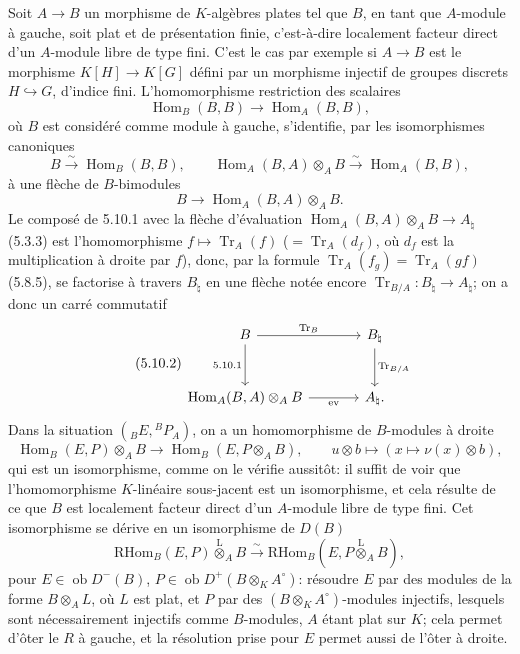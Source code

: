 \documentclass[11pt]{article}
\DeclareMathOperator{\Hom}{Hom}
\newcommand{\ob}{\operatorname{ob}}
\providecommand{\RHom}{\mathrm{RHom}}
\providecommand{\Tr}{\operatorname{Tr}}
\providecommand{\Tr}{\operatorname{Tr}}
\providecommand{\lten}{\overset{\mathrm L}{\otimes}}
\providecommand{\Tr}{\operatorname{Tr}}
\providecommand{\RHom}{\mathrm{RHom}}
\providecommand{\Hom}{\operatorname{Hom}}
\providecommand{\ob}{\operatorname{ob}}
\providecommand{\lten}{\overset{\mathrm L}{\otimes}}
\providecommand{\RHom}{\mathrm R\mathcal{H}om}
\providecommand{\lten}{\overset{\mathrm L}{\otimes}}
\providecommand{\Tr}{\operatorname{Tr}}
\providecommand{\lten}{\overset{\mathrm L}{\otimes}}
\providecommand{\lten}{\overset{\mathrm L}{\otimes}}
\providecommand{\lten}{\overset{\mathrm L}{\otimes}}
\begin{document}
Soit $A\to B$ un morphisme de $K$-algèbres plates tel que $B$, en tant que $A$-module à gauche, soit plat et de présentation finie, c'est-à-dire localement facteur direct d'un $A$-module libre de type fini. C'est le cas par exemple si $A\to B$ est le morphisme $K[H]\to K[G]$ défini par un morphisme injectif de groupes discrets $H\hookrightarrow G$, d'indice fini. L'homomorphisme restriction des scalaires
\[
\Hom_B(B,B)\longrightarrow\Hom_A(B,B),
\]
où $B$ est considéré comme module à gauche, s'identifie, par les isomorphismes canoniques
\[
B\xrightarrow{\sim}\Hom_B(B,B),\qquad \Hom_A(B,A)\otimes_AB\xrightarrow{\sim}\Hom_A(B,B),
\]
à une flèche de $B$-bimodules
\begin{equation}\tag{5.10.1}
B\longrightarrow\Hom_A(B,A)\otimes_AB.
\end{equation}
Le composé de 5.10.1 avec la flèche d'évaluation $\Hom_A(B,A)\otimes_AB\to A_\natural$ (5.3.3) est l'homomorphisme $f\mapsto\Tr_A(f)$ ($=\Tr_A(d_f)$, où $d_f$ est la multiplication à droite par $f$), donc, par la formule $\Tr_A(f_g)=\Tr_A(gf)$ (5.8.5), se factorise à travers $B_\natural$ en une flèche notée encore $\Tr_{B/A}:B_\natural\to A_\natural$; on a donc un carré commutatif
\begin{equation}\tag{5.10.2}
\begin{tikzcd}[column sep=large,row sep=large]
B \arrow[r,"\Tr_B"] \arrow[d,"5.10.1"'] & B_\natural \arrow[d,"\Tr_{B/A}"]\\
\Hom_A(B,A)\otimes_AB \arrow[r,"\mathrm{ev}"'] & A_\natural .
\end{tikzcd}
\end{equation}
Dans la situation $({}_BE,{}^BP_A)$, on a un homomorphisme de $B$-modules à droite
\begin{equation}\tag{5.10.3}
\Hom_B(E,P)\otimes_AB\longrightarrow\Hom_B(E,P\otimes_AB),\qquad
u\otimes b\longmapsto(x\longmapsto\nu(x)\otimes b),
\end{equation}
qui est un isomorphisme, comme on le vérifie aussitôt: il suffit de voir que l'homomorphisme $K$-linéaire sous-jacent est un isomorphisme, et cela résulte de ce que $B$ est localement facteur direct d'un $A$-module libre de type fini. Cet isomorphisme se dérive en un isomorphisme de $D(B)$
\begin{equation}\tag{5.10.4}
\RHom_B(E,P)\lten_AB\xrightarrow{\sim}\RHom_B(E,P\lten_AB),
\end{equation}
pour $E\in\ob D^-(B)$, $P\in\ob D^+(B\otimes_KA^\circ)$: résoudre $E$ par des modules de la forme $B\otimes_AL$, où $L$ est plat, et $P$ par des $(B\otimes_KA^\circ)$-modules injectifs, lesquels sont nécessairement injectifs comme $B$-modules, $A$ étant plat sur $K$; cela permet d'ôter le $R$ à gauche, et la résolution prise pour $E$ permet aussi de l'ôter à droite.
\end{document}
